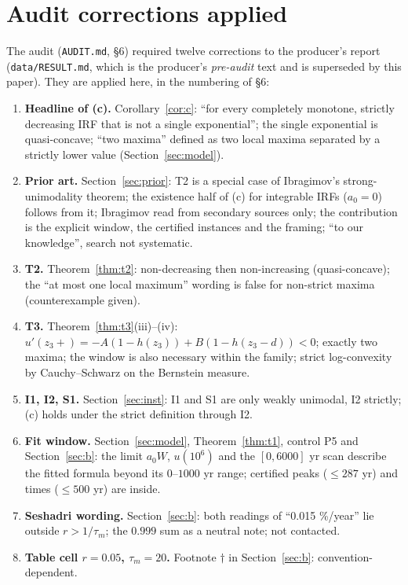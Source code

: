 \documentclass[10pt]{article}
\theoremstyle{plain}
\begin{document}
\section{Audit corrections applied}\label{sec:corr}
The audit (\texttt{AUDIT.md}, \S6) required twelve corrections to the producer's report (\texttt{data/RESULT.md}, which is the producer's \emph{pre-audit} text and is superseded by this paper). They are applied here, in the numbering of \S6:
\begin{enumerate}\itemsep=1pt
\item \textbf{Headline of (c).} Corollary~\ref{cor:c}: ``for every completely monotone, strictly decreasing IRF that is not a single exponential''; the single exponential is quasi-concave; ``two maxima'' defined as two local maxima separated by a strictly lower value (Section~\ref{sec:model}).
\item \textbf{Prior art.} Section~\ref{sec:prior}: T2 is a special case of Ibragimov's strong-unimodality theorem; the existence half of (c) for integrable IRFs ($a_0=0$) follows from it; Ibragimov read from secondary sources only; the contribution is the explicit window, the certified instances and the framing; ``to our knowledge'', search not systematic.
\item \textbf{T2.} Theorem~\ref{thm:t2}: non-decreasing then non-increasing (quasi-concave); the ``at most one local maximum'' wording is false for non-strict maxima (counterexample given).
\item \textbf{T3.} Theorem~\ref{thm:t3}(iii)--(iv): $u'(z_3+)=-A(1-h(z_3))+B(1-h(z_3-d))<0$; exactly two maxima; the window is also necessary within the family; strict log-convexity by Cauchy--Schwarz on the Bernstein measure.
\item \textbf{I1, I2, S1.} Section~\ref{sec:inst}: I1 and S1 are only weakly unimodal, I2 strictly; (c) holds under the strict definition through I2.
\item \textbf{Fit window.} Section~\ref{sec:model}, Theorem~\ref{thm:t1}, control P5 and Section~\ref{sec:b}: the limit $a_0W$, $u(10^6)$ and the $[0,6000]$ yr scan describe the fitted formula beyond its $0$--$1000$ yr range; certified peaks ($\le287$ yr) and times ($\le500$ yr) are inside.
\item \textbf{Seshadri wording.} Section~\ref{sec:b}: both readings of ``0.015 \%/year'' lie outside $r>1/\tau_m$; the $0.999$ sum as a neutral note; not contacted.
\item \textbf{Table cell $r=0.05$, $\tau_m=20$.} Footnote $\dagger$ in Section~\ref{sec:b}: convention-dependent.

\end{enumerate}
\end{document}
